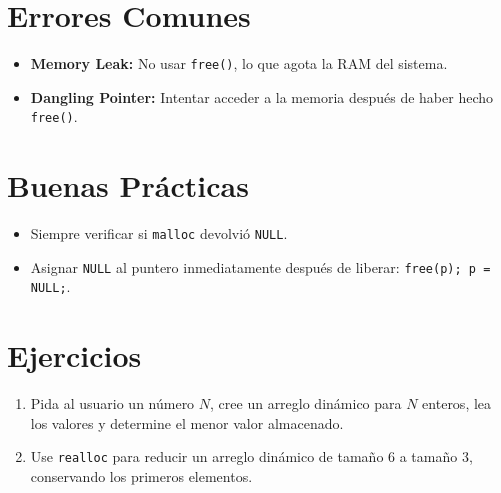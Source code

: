 \documentclass[12pt,a4paper]{article}
\begin{document}
\section{Errores Comunes}
\begin{itemize}
    \item \textbf{Memory Leak:} No usar \texttt{free()}, lo que agota la RAM del sistema.
    \item \textbf{Dangling Pointer:} Intentar acceder a la memoria después de haber hecho \texttt{free()}.
\end{itemize}

\section{Buenas Prácticas}
\begin{itemize}
    \item Siempre verificar si \texttt{malloc} devolvió \texttt{NULL}.
    \item Asignar \texttt{NULL} al puntero inmediatamente después de liberar: \texttt{free(p); p = NULL;}.
\end{itemize}

\section{Ejercicios}
\begin{enumerate}
    \item Pida al usuario un número $N$, cree un arreglo dinámico para $N$ enteros, lea los valores y determine el menor valor almacenado.
    \item Use \texttt{realloc} para reducir un arreglo dinámico de tamaño 6 a tamaño 3, conservando los primeros elementos.
\end{enumerate}
\end{document}
